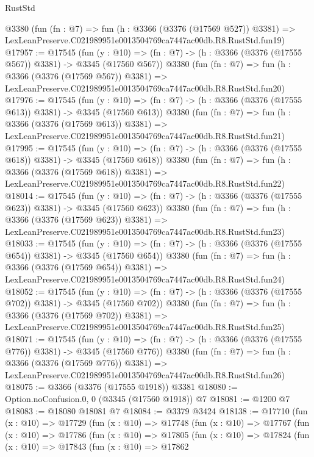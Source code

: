 \begin{lexlean}{RustStd}
\begin{coremodule}
    @3380
    (fun (fn : @7) =>
    fun (h : @3366 (@3376 (@17569 @527)) @3381) =>
    LexLeanPreserve.C021989951e0013504769ca7447ac00db.R8.RustStd.fun19)
@17957 := @17545
    (fun (y : @10) => (fn : @7) -> (h : @3366 (@3376 (@17555 @567)) @3381) -> @3345 (@17560 @567))
    @3380
    (fun (fn : @7) =>
    fun (h : @3366 (@3376 (@17569 @567)) @3381) =>
    LexLeanPreserve.C021989951e0013504769ca7447ac00db.R8.RustStd.fun20)
@17976 := @17545
    (fun (y : @10) => (fn : @7) -> (h : @3366 (@3376 (@17555 @613)) @3381) -> @3345 (@17560 @613))
    @3380
    (fun (fn : @7) =>
    fun (h : @3366 (@3376 (@17569 @613)) @3381) =>
    LexLeanPreserve.C021989951e0013504769ca7447ac00db.R8.RustStd.fun21)
@17995 := @17545
    (fun (y : @10) => (fn : @7) -> (h : @3366 (@3376 (@17555 @618)) @3381) -> @3345 (@17560 @618))
    @3380
    (fun (fn : @7) =>
    fun (h : @3366 (@3376 (@17569 @618)) @3381) =>
    LexLeanPreserve.C021989951e0013504769ca7447ac00db.R8.RustStd.fun22)
@18014 := @17545
    (fun (y : @10) => (fn : @7) -> (h : @3366 (@3376 (@17555 @623)) @3381) -> @3345 (@17560 @623))
    @3380
    (fun (fn : @7) =>
    fun (h : @3366 (@3376 (@17569 @623)) @3381) =>
    LexLeanPreserve.C021989951e0013504769ca7447ac00db.R8.RustStd.fun23)
@18033 := @17545
    (fun (y : @10) => (fn : @7) -> (h : @3366 (@3376 (@17555 @654)) @3381) -> @3345 (@17560 @654))
    @3380
    (fun (fn : @7) =>
    fun (h : @3366 (@3376 (@17569 @654)) @3381) =>
    LexLeanPreserve.C021989951e0013504769ca7447ac00db.R8.RustStd.fun24)
@18052 := @17545
    (fun (y : @10) => (fn : @7) -> (h : @3366 (@3376 (@17555 @702)) @3381) -> @3345 (@17560 @702))
    @3380
    (fun (fn : @7) =>
    fun (h : @3366 (@3376 (@17569 @702)) @3381) =>
    LexLeanPreserve.C021989951e0013504769ca7447ac00db.R8.RustStd.fun25)
@18071 := @17545
    (fun (y : @10) => (fn : @7) -> (h : @3366 (@3376 (@17555 @776)) @3381) -> @3345 (@17560 @776))
    @3380
    (fun (fn : @7) =>
    fun (h : @3366 (@3376 (@17569 @776)) @3381) =>
    LexLeanPreserve.C021989951e0013504769ca7447ac00db.R8.RustStd.fun26)
@18075 := @3366 (@3376 (@17555 @1918)) @3381
@18080 := Option.noConfusion.{0, 0} (@3345 (@17560 @1918)) @7
@18081 := @1200 @7
@18083 := @18080 @18081 @7
@18084 := @3379 @3424
@18138 := @17710
    (fun (x : @10) =>
    @17729
      (fun (x : @10) =>
      @17748
        (fun (x : @10) =>
        @17767
          (fun (x : @10) =>
          @17786
            (fun (x : @10) =>
            @17805
              (fun (x : @10) =>
              @17824
                (fun (x : @10) =>
                @17843
                  (fun (x : @10) =>
                  @17862

\end{coremodule}
\end{lexlean}
